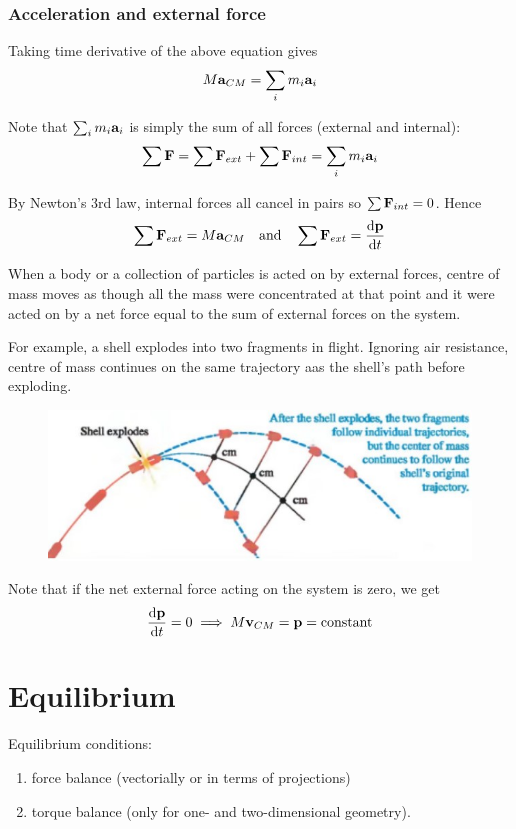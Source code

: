 \subsubsection{Acceleration and external force}
Taking time derivative of the above equation gives
\[ M\vb{a}_{CM} = \sum_{i}m_i\vb{a}_i \]

Note that $\sum_{i}m_i\vb{a}_i$ is simply the sum of all forces (external and internal):
\[ \sum\vb{F} = \sum\vb{F}_{ext} + \sum\vb{F}_{int} = \sum_{i}m_i\vb{a}_i \]

By Newton's 3rd law, internal forces all cancel in pairs so $\sum\vb{F}_{int}=0$. Hence
\begin{equation}
\sum\vb{F}_{ext} = M\vb{a}_{CM} \quad \text{and} \quad \sum\vb{F}_{ext}=\odv{\vb{p}}{t}
\end{equation}

When a body or a collection of particles is acted on by external forces, centre of mass moves as though all the mass were concentrated at that point and it were acted on by a net force equal to the sum of external forces on the system.

For example, a shell explodes into two fragments in flight. Ignoring air resistance, centre of mass continues on the same trajectory aas the shell's path before exploding.
\begin{figure}[H]
    \centering
    \includegraphics{images/shell_explode_cm.jpg}
\end{figure}

Note that if the net external force acting on the system is zero, we get
\[ \dv{\vb{p}}{t}=0 \implies M\vb{v}_{CM}=\vb{p}=\text{constant} \]
\pagebreak

\section{Equilibrium}
Equilibrium conditions: 
\begin{enumerate}
\item force balance (vectorially or in terms of projections)
\item torque balance (only for one- and two-dimensional geometry). 
\end{enumerate}

